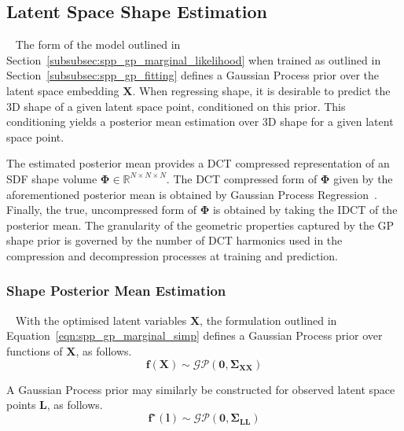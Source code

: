 \subsection{Latent Space Shape Estimation}
~\label{subsec:spp_latent_shape_est}
The form of the model outlined in Section~\ref{subsubsec:spp_gp_marginal_likelihood}
when trained as outlined in Section~\ref{subsubsec:spp_gp_fitting} defines a Gaussian 
Process prior over the latent space embedding \( \bm{X} \). When regressing shape, it 
is desirable to predict the 3D shape of a given latent space point, conditioned on this 
prior. This conditioning yields a posterior mean estimation over 3D shape for a given 
latent space point.

The estimated posterior mean provides a DCT compressed representation of an SDF shape 
volume \( \bm{\Phi} \in \mathbb{R}^{N \times N \times N} \). The DCT compressed form 
of \( \bm{\Phi} \) given by the aforementioned posterior mean is obtained by Gaussian 
Process Regression~\cite{GPML}. Finally, the true, uncompressed form of \( \bm{\Phi} \) is 
obtained by taking the IDCT of the posterior mean. The granularity of the geometric 
properties captured by the GP shape prior is governed by the number of DCT harmonics 
used in the compression and decompression processes at training and prediction.

\subsubsection{Shape Posterior Mean Estimation}
~\label{subsubsec:spp_pos_mean_est}
With the optimised latent variables \( \bm{X} \), the formulation outlined in 
Equation~\ref{eqn:spp_gp_marginal_simp} defines a Gaussian Process prior 
over functions of \( \bm{X} \), as follows.
\begin{equation}
  \label{eqn:gp_prior}
  \bm{f}(\bm{X}) \sim \mathcal{GP}(\bm{0}, \bm{\Sigma}_{\bm{XX}})
\end{equation}

A Gaussian Process prior may similarly be constructed for observed latent 
space points \( \bm{L} \), as follows.
\begin{equation}
  \label{eqn:gp_prior_latent}
  \bm{f}^{\star}(\bm{l}) \sim \mathcal{GP}(\bm{0}, \bm{\Sigma}_{\bm{LL}})
\end{equation}

